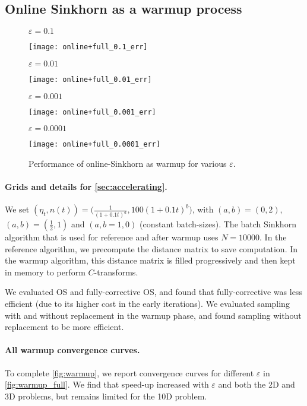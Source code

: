 \subsection{Online Sinkhorn as a warmup process}\label{app:warmup_exp}


\begin{figure}[t]
    \centering
    $\varepsilon = 0.1$

    \texttt{[image: online+full\_0.1\_err]}
    
    $\varepsilon = 0.01$

    \texttt{[image: online+full\_0.01\_err]}

    $\varepsilon = 0.001$

    \texttt{[image: online+full\_0.001\_err]}

    $\varepsilon = 0.0001$

    \texttt{[image: online+full\_0.0001\_err]}
    \caption{Performance of online-Sinkhorn as warmup for various $\varepsilon$.}
    \label{fig:warmup_full}
\end{figure}

\paragraph{Grids and details for \autoref{sec:accelerating}.} 
We set $(\eta_t, n(t)) = \big(\frac{1}{(1 + 0.1t)^a}, 100 (1 + 0.1t)^{b}\big)$,
with $(a, b) = (0, 2)$, $(a, b) = (\frac{1}{2}, 1)$ and $(a,b =1, 0)$ (constant
batch-sizes). The batch Sinkhorn algorithm that is used for reference and after
warmup uses $N=10000$. In the reference algorithm, we precompute the distance
matrix to save computation. In the warmup algorithm, this distance matrix is
filled progressively and then kept in memory to perform $C$-transforms.

We evaluated OS and fully-corrective OS, and found that fully-corrective was
less efficient (due to its higher cost in the early iterations). We evaluated
sampling with and without replacement in the warmup phase, and found sampling
without replacement to be more efficient.

\paragraph{All warmup convergence curves.} To complete \autoref{fig:warmup}, we
report convergence curves for different $\varepsilon$ in
\autoref{fig:warmup_full}. We find that speed-up increased with $\varepsilon$ and both the 2D and 3D problems, but remains limited for the 10D problem.

